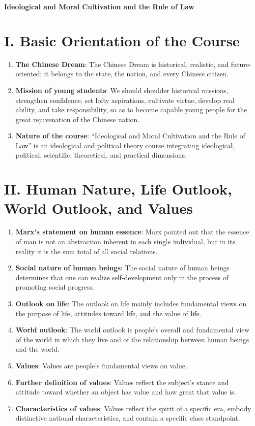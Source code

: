 \documentclass[11pt,a4paper]{ctexart}
\begin{document}
\begin{center}
    {\LARGE \textbf{Ideological and Moral Cultivation and the Rule of Law}}\\[0.5em]
\end{center}

\section{I. Basic Orientation of the Course}

\begin{enumerate}[leftmargin=2em]
    \item \textbf{The Chinese Dream}: The Chinese Dream is historical, realistic, and future-oriented; it belongs to the state, the nation, and every Chinese citizen.
    \item \textbf{Mission of young students}: We should shoulder historical missions, strengthen confidence, set lofty aspirations, cultivate virtue, develop real ability, and take responsibility, so as to become capable young people for the great rejuvenation of the Chinese nation.
    \item \textbf{Nature of the course}: ``Ideological and Moral Cultivation and the Rule of Law'' is an ideological and political theory course integrating ideological, political, scientific, theoretical, and practical dimensions.
\end{enumerate}

\section{II. Human Nature, Life Outlook, World Outlook, and Values}

\begin{enumerate}[leftmargin=2em]
    \item \textbf{Marx's statement on human essence}: Marx pointed out that the essence of man is not an abstraction inherent in each single individual, but in its reality it is the sum total of all social relations.
    \item \textbf{Social nature of human beings}: The social nature of human beings determines that one can realize self-development only in the process of promoting social progress.
    \item \textbf{Outlook on life}: The outlook on life mainly includes fundamental views on the purpose of life, attitudes toward life, and the value of life.
    \item \textbf{World outlook}: The world outlook is people's overall and fundamental view of the world in which they live and of the relationship between human beings and the world.
    \item \textbf{Values}: Values are people's fundamental views on value.
    \item \textbf{Further definition of values}: Values reflect the subject's stance and attitude toward whether an object has value and how great that value is.
    \item \textbf{Characteristics of values}: Values reflect the spirit of a specific era, embody distinctive national characteristics, and contain a specific class standpoint.
\end{enumerate}
\end{document}
